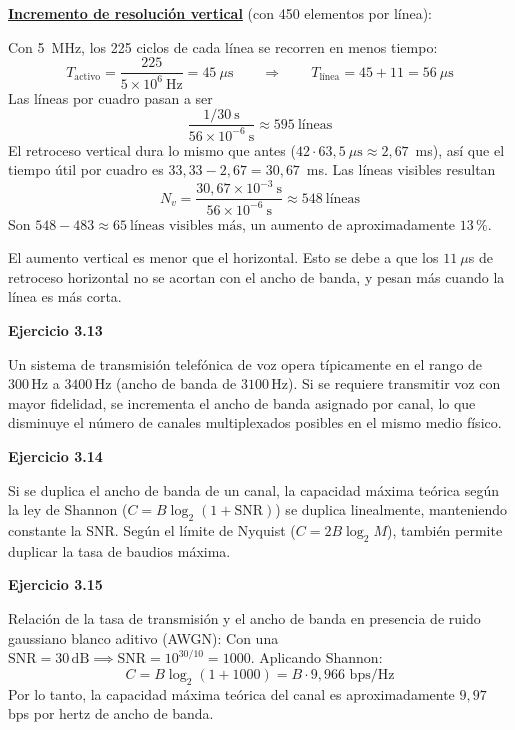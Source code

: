 \documentclass[11pt,a4paper]{article}
\begin{document}
\noindent\underline{\textbf{Incremento de resolución vertical}} (con 450 elementos por línea):

Con 5~MHz, los 225 ciclos de cada línea se recorren en menos tiempo:
\[
  T_{\text{activo}} = \frac{225}{5 \times 10^6~\text{Hz}} = 45~\mu\text{s}
  \qquad\Longrightarrow\qquad
  T_{\text{línea}} = 45 + 11 = 56~\mu\text{s}
\]
Las líneas por cuadro pasan a ser
\[
  \frac{1/30~\text{s}}{56 \times 10^{-6}~\text{s}} \approx 595~\text{líneas}
\]
El retroceso vertical dura lo mismo que antes ($42 \cdot 63{,}5~\mu\text{s} \approx 2{,}67$~ms), así que el tiempo útil por cuadro es $33{,}33 - 2{,}67 = 30{,}67$~ms. Las líneas visibles resultan
\[
  N_v = \frac{30{,}67 \times 10^{-3}~\text{s}}{56 \times 10^{-6}~\text{s}} \approx 548~\text{líneas}
\]
Son $548 - 483 \approx \boxed{65~\text{líneas visibles más}}$, un aumento de aproximadamente $13\,\%$.

El aumento vertical es menor que el horizontal. Esto se debe a que los $11~\mu$s de retroceso horizontal no se acortan con el ancho de banda, y pesan más cuando la línea es más corta.

\vspace{0.3cm}
\noindent\textbf{Ejercicio 3.13}\par
Un sistema de transmisión telefónica de voz opera típicamente en el rango de $300\,\mathrm{Hz}$ a $3400\,\mathrm{Hz}$ (ancho de banda de $3100\,\mathrm{Hz}$). Si se requiere transmitir voz con mayor fidelidad, se incrementa el ancho de banda asignado por canal, lo que disminuye el número de canales multiplexados posibles en el mismo medio físico.

\vspace{0.3cm}
\noindent\textbf{Ejercicio 3.14}\par
Si se duplica el ancho de banda de un canal, la capacidad máxima teórica según la ley de Shannon ($C = B \log_2(1 + \mathrm{SNR})$) se duplica linealmente, manteniendo constante la SNR. Según el límite de Nyquist ($C = 2B \log_2 M$), también permite duplicar la tasa de baudios máxima.

\vspace{0.3cm}
\noindent\textbf{Ejercicio 3.15}\par
Relación de la tasa de transmisión y el ancho de banda en presencia de ruido gaussiano blanco aditivo (AWGN):
Con una $\mathrm{SNR} = 30\,\text{dB} \implies \mathrm{SNR} = 10^{30/10} = 1000$.
Aplicando Shannon:
\[
  C = B \log_2(1 + 1000) = B \cdot 9{,}966 \text{ bps/Hz}
\]
Por lo tanto, la capacidad máxima teórica del canal es aproximadamente $9{,}97$ bps por hertz de ancho de banda.
\end{document}
